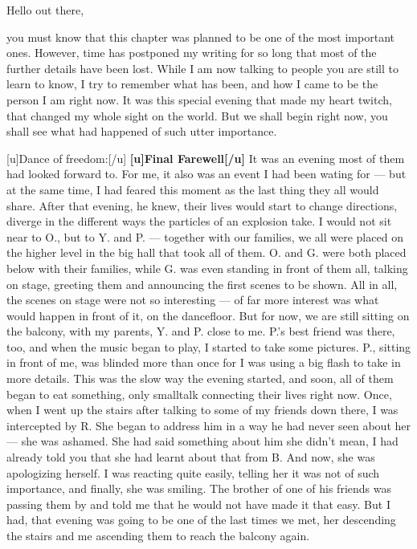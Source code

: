 Hello out there, 

you must know that this chapter was planned to be one of the most important ones. However, time has postponed my writing for so long that most of the further details have been lost. While I am now talking to people you are still to learn to know, I try to remember what has been, and how I came to be the person I am right now. It was this special evening that made my heart twitch, that changed my whole sight on the world. But we shall begin right now, you shall see what had happened of such utter importance. 

[u]Dance of freedom:[/u]
\textbf{[u]Final Farewell[/u]}
It was an evening most of them had looked forward to. For me, it also was an event I had been wating for --- but at the same time, I had feared this moment as the last thing they all would share. After that evening, he knew, their lives would start to change directions, diverge in the different ways the particles of an explosion take. 
I would not sit near to O., but to Y. and P. --- together with our families, we all were placed on the higher level in the big hall that took all of them. O. and G. were both placed below with their families, while G. was even standing in front of them all, talking on stage, greeting them and announcing the first scenes to be shown. All in all, the scenes on stage were not so interesting --- of far more interest was what would happen in front of it, on the dancefloor. But for now, we are still sitting on the balcony, with my parents, Y. and P. close to me. P.'s best friend was there, too, and when the music began to play, I started to take some pictures. P., sitting in front of me, was blinded more than once for I was using a big flash to take in more details. 
This was the slow way the evening started, and soon, all of them began to eat something, only smalltalk connecting their lives right now. Once, when I went up the stairs after talking to some of my friends down there, I was intercepted by R. She began to address him in a way he had never seen about her --- she was ashamed. She had said something about him she didn't mean, I had already told you that she had learnt about that from B. And now, she was apologizing herself. I was reacting quite easily, telling her it was not of such importance, and finally, she was smiling. The brother of one of his friends was passing them by and told me that he would not have made it that easy. But I had, that evening was going to be one of the last times we met, her descending the stairs and me ascending them to reach the balcony again. 
